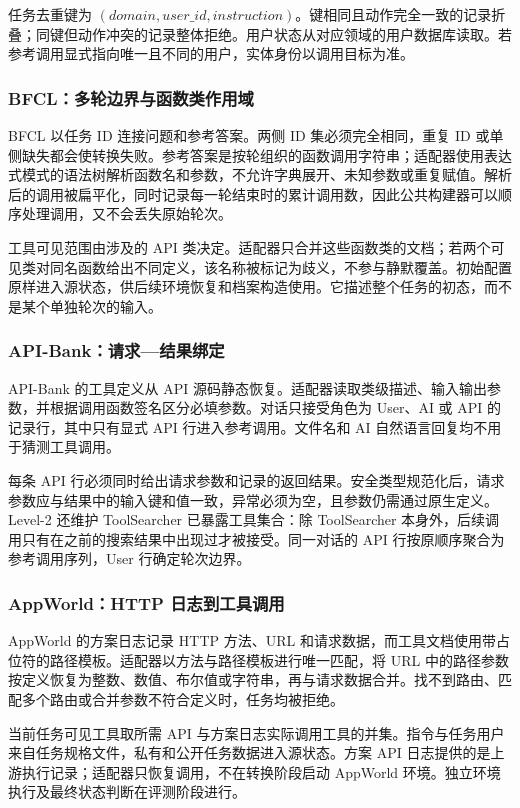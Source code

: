 任务去重键为 $(domain, user\_id, instruction)$。键相同且动作完全一致的记录折叠；同键但动作冲突的记录整体拒绝。用户状态从对应领域的用户数据库读取。若参考调用显式指向唯一且不同的用户，实体身份以调用目标为准。

\subsubsection{BFCL：多轮边界与函数类作用域}

BFCL 以任务 ID 连接问题和参考答案。两侧 ID 集必须完全相同，重复 ID 或单侧缺失都会使转换失败。参考答案是按轮组织的函数调用字符串；适配器使用表达式模式的语法树解析函数名和参数，不允许字典展开、未知参数或重复赋值。解析后的调用被扁平化，同时记录每一轮结束时的累计调用数，因此公共构建器可以顺序处理调用，又不会丢失原始轮次。

工具可见范围由涉及的 API 类决定。适配器只合并这些函数类的文档；若两个可见类对同名函数给出不同定义，该名称被标记为歧义，不参与静默覆盖。初始配置原样进入源状态，供后续环境恢复和档案构造使用。它描述整个任务的初态，而不是某个单独轮次的输入。

\subsubsection{API-Bank：请求—结果绑定}

API-Bank 的工具定义从 API 源码静态恢复。适配器读取类级描述、输入输出参数，并根据调用函数签名区分必填参数。对话只接受角色为 User、AI 或 API 的记录行，其中只有显式 API 行进入参考调用。文件名和 AI 自然语言回复均不用于猜测工具调用。

每条 API 行必须同时给出请求参数和记录的返回结果。安全类型规范化后，请求参数应与结果中的输入键和值一致，异常必须为空，且参数仍需通过原生定义。Level-2 还维护 ToolSearcher 已暴露工具集合：除 ToolSearcher 本身外，后续调用只有在之前的搜索结果中出现过才被接受。同一对话的 API 行按原顺序聚合为参考调用序列，User 行确定轮次边界。

\subsubsection{AppWorld：HTTP 日志到工具调用}

AppWorld 的方案日志记录 HTTP 方法、URL 和请求数据，而工具文档使用带占位符的路径模板。适配器以方法与路径模板进行唯一匹配，将 URL 中的路径参数按定义恢复为整数、数值、布尔值或字符串，再与请求数据合并。找不到路由、匹配多个路由或合并参数不符合定义时，任务均被拒绝。

当前任务可见工具取所需 API 与方案日志实际调用工具的并集。指令与任务用户来自任务规格文件，私有和公开任务数据进入源状态。方案 API 日志提供的是上游执行记录；适配器只恢复调用，不在转换阶段启动 AppWorld 环境。独立环境执行及最终状态判断在评测阶段进行。

